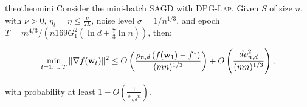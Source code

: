 \documentclass[11pt]{article}
\begin{document}

\begin{restatable}{theo}{theomini}
\label{thm: main_rmsprop_mini}
Consider the mini-batch \textsc{SAGD} with \textsc{DPG-Lap}. 
Given $S$ of size $n$, with $\nu >0$, $\eta_t = \eta \leq \frac{\nu}{2L}$, noise level $\sigma = 1/n^{1/3}$, and epoch $T = m^{4/3}/\left(n169G_1^2(\ln d + \frac{7}{3}\ln n)\right)$, then:
 \begin{small}
\begin{equation*}
\begin{split}
 \min_{t = 1,..., T}\|\nabla f(\mathbf{w}_t)\|^2 
 \leq O\left( \frac{\rho_{n,d} \left(f(\mathbf{w}_1) - f^\star \right)}{(mn)^{1/3}} \right)+ O \left( \frac{d \rho_{n,d}^2}{(mn)^{1/3}}\right),
 \end{split}
\end{equation*}
\end{small}
with probability at least $1-O\left(\frac{1}{\rho_{n,d} n}\right)$.
\end{restatable}
\end{document}
